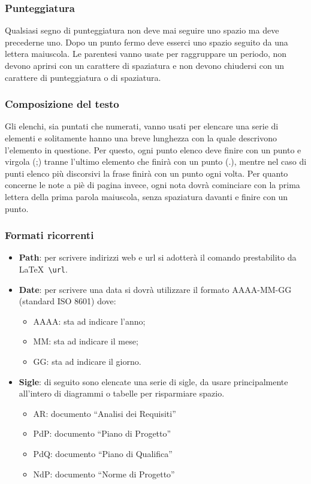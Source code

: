 \subsubsection{Punteggiatura}
Qualsiasi segno di punteggiatura non deve mai seguire uno spazio ma deve precederne uno. Dopo un punto fermo deve esserci uno spazio seguito da una lettera maiuscola.
\newline
Le parentesi vanno usate per raggruppare un periodo, non devono aprirsi con un carattere di spaziatura e non devono chiudersi con un carattere di punteggiatura o di spaziatura.

\subsubsection{Composizione del testo}
Gli elenchi, sia puntati che numerati, vanno usati per elencare una serie di elementi e solitamente hanno una breve lunghezza con la quale descrivono l'elemento in questione. Per questo, ogni punto elenco deve finire con un punto e virgola (;) tranne l'ultimo elemento che finirà con un punto (.), mentre nel caso di punti elenco più discorsivi la frase finirà con un punto ogni volta.
\newline
Per quanto concerne le note a piè di pagina invece, ogni nota dovrà cominciare con la prima lettera della prima parola maiuscola, senza spaziatura davanti e finire con un punto.

\subsubsection{Formati ricorrenti}
\label{sec:formati_ricorrenti} 
\begin{itemize}
\item \textbf{Path}: per scrivere indirizzi web e url si adotterà il comando prestabilito da \LaTeX \verb+ \url+.
\item \textbf{Date}: per scrivere una data si dovrà utilizzare il formato AAAA-MM-GG (standard ISO 8601) dove:
\begin{itemize}
\item AAAA: sta ad indicare l'anno;
\item MM: sta ad indicare il mese;
\item GG: sta ad indicare il giorno.
\end{itemize}
\item \textbf{Sigle}: di seguito sono elencate una serie di sigle, da usare principalmente all'intero di diagrammi o tabelle per risparmiare spazio.
\begin{itemize}
\item AR: documento ``Analisi dei Requisiti''
\item PdP: documento ``Piano di Progetto''
\item PdQ: documento ``Piano di Qualifica''
\item NdP: documento ``Norme di Progetto''
\end{itemize}
\end{itemize}

